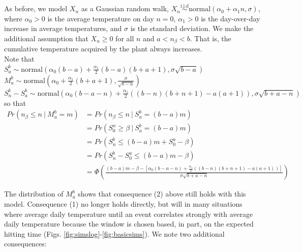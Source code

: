 \documentclass[11pt]{article}
\begin{document}
As before, we model $X_n$ as a Gaussian random walk, $X_n \overset{\text{i.i.d}}{\sim} \text{normal}\left ( \alpha_0 + \alpha_1 n , \sigma \right )$, where $\alpha_0 > 0$ is the average temperature on day $n = 0$, $\alpha_1 > 0$ is the day-over-day increase in average temperatures, and $\sigma$ is the standard deviation. We make the additional assumption that $X_n \geq 0$ for all $n$ and $a < n_{\beta} < b$. That is, the cumulative temperature acquired by the plant always increases. \\ %

Note that \\

$S_a^b \sim \text{normal}\left ( \alpha_0 (b - a) + \frac{\alpha_1}{2} (b-a)(b+a+1), \sigma \sqrt{b - a} \right )$ \\

$M_a^b \sim \text{normal}\left ( \alpha_0 + \frac{\alpha_1}{2} (b+a+1), \frac{\sigma}{\sqrt{b - a}} \right )$ \\ %

$S_n^b - S_a^b  \sim \text{normal}\left ( \alpha_0 (b - a - n) + \frac{\alpha_1}{2} ( (b-n)(b+n+1) - a(a+1) ), \sigma \sqrt{b + a - n} \right )$ \\ %

so that
\begin{align*}
Pr \left ( n_{\beta} \leq n \ \big |  \ M_{a}^b = m \right ) &= Pr \left ( n_{\beta} \leq n \ \big |  \ S_a^b = (b-a) m \right ) \\ %
&= Pr \left ( S_0^n \geq \beta \ \big |  \ S_a^b = (b-a) m \right ) \\
&= Pr \left ( S_n^b \leq (b-a) m + S_0^a - \beta \right ) \\
&= Pr \left ( S_n^b - S_0^a \leq (b-a) m - \beta \right ) \\
&= \Phi \left ( \frac{(b-a) m - \beta -    [ \alpha_0 (b - a - n) + \frac{\alpha_1}{2} ( (b-n)(b+n+1) - a(a+1) ) ] }{\sigma \sqrt{b + a - n}} \right )
\end{align*}
\vspace{3ex}

The distribution of $M_a^b$ shows that consequence (2) above still holds with this model. Consequence (1) no longer holds directly, but will in many situations where average daily temperature until an event correlates strongly with average daily temperature because the window is chosen based, in part, on the expected hitting time (Figs. \ref{fig:simslog}-\ref{fig:basicsims}). We note two additional consequences: \\
\end{document}
